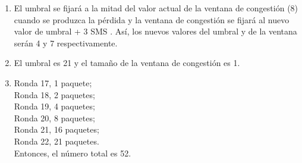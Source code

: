 \documentclass[a4paper, 11pt]{article}
\theoremstyle{definition} \theoremstyle{remark}
\begin{document}
\begin{enumerate}
      \item El umbral se fijar\'a a la mitad del valor actual de la ventana de congesti\'on (8) cuando se produzca la p\'erdida y la ventana de congesti\'on se fijar\'a al nuevo valor de umbral + 3 SMS . As\'i, los nuevos valores del umbral y de la ventana ser\'an 4 y 7 respectivamente.
      \item El umbral es 21 y el tama\~{n}o de la ventana de congesti\'on es 1.
      \item Ronda 17, 1 paquete;\\
            Ronda 18, 2 paquetes; \\
            Ronda 19, 4 paquetes;\\
            Ronda 20, 8 paquetes; \\
            Ronda 21, 16 paquetes; \\
            Ronda 22, 21 paquetes. \\
            Entonces, el n\'umero total es 52.
    \end{enumerate}
\end{document}
